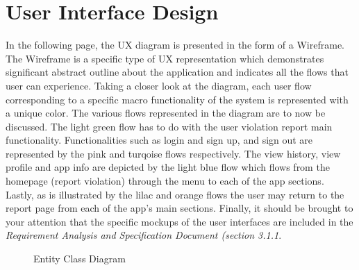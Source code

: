 \section{User Interface Design}
In the following page, the UX diagram is presented in the form of a Wireframe. The Wireframe is a specific type of UX representation which demonstrates significant abstract outline about the application and indicates all the flows that user can experience.  Taking a closer look at the diagram, each user flow corresponding to a specific macro functionality of the system is represented with a unique color. The various flows represented in the diagram are to now be discussed. The light green flow has to do with the user violation report main functionality. Functionalities such as login and sign up, and sign out are represented by the pink and turqoise flows respectively. The view history, view profile and app info are depicted by the light blue flow which flows from the homepage (report violation) through the menu to each of the app sections. Lastly, as is illustrated by the lilac and orange flows the user may return to the report page from each of the app's main sections. Finally, it should be brought to your attention that the specific mockups of the user interfaces are included in the \emph{Requirement Analysis and Specification Document (section 3.1.1}.

\begin{sidewaysfigure}
\begin{figure}[H]
\caption{Entity Class Diagram}
\label{fig:Class}
\centering
%
\end{figure}
\end{sidewaysfigure}

